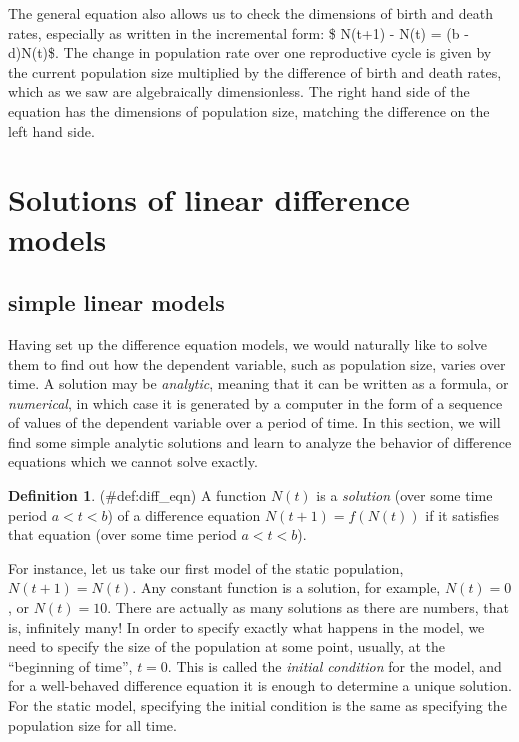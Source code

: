 \documentclass[
]{book}
\theoremstyle{definition}
\newtheorem{definition}{Definition}[chapter]
\theoremstyle{definition}
\theoremstyle{definition}
\theoremstyle{remark}
\begin{document}
The general equation also allows us to check the dimensions of birth and death rates, especially as written in the incremental form: \$ N(t+1) - N(t) = (b - d)N(t)\$. The change in population rate over one reproductive cycle is given by the current population size multiplied by the difference of birth and death rates, which as we saw are algebraically dimensionless. The right hand side of the equation has the dimensions of population size, matching the difference on the left hand side. \citep{edelstein-keshet_mathematical_2005}

\hypertarget{solutions-of-linear-difference-models}{%
\section{Solutions of linear difference models}\label{solutions-of-linear-difference-models}}

\label{sec:math14}

\hypertarget{simple-linear-models}{%
\subsection{simple linear models}\label{simple-linear-models}}

Having set up the difference equation models, we would naturally like to solve them to find out how the dependent variable, such as population size, varies over time. A solution may be  \emph{analytic}, meaning that it can be written as a formula, or  \emph{numerical}, in which case it is generated by a computer in the form of a sequence of values of the dependent variable over a period of time. In this section, we will find some simple analytic solutions and learn to analyze the behavior of difference equations which we cannot solve exactly.

\begin{definition}
\protect\hypertarget{def:diff_eqn}{}{(\#def:diff\_eqn) }A function \(N(t)\) is a \emph{solution} (over some time period \(a < t < b\)) of a difference equation \(N(t+1) = f(N(t))\) if it satisfies that equation (over some time period \(a < t < b\)).
\end{definition}

\label{def:math14_sol}

For instance, let us take our first model of the static population, \(N(t+1) = N(t)\). Any constant function is a solution, for example, \(N(t) = 0\), or \(N(t) = 10\). There are actually as many solutions as there are numbers, that is, infinitely many! In order to specify exactly what happens in the model, we need to specify the size of the population at some point, usually, at the ``beginning of time'', \(t = 0\). This is called the  \emph{initial condition} for the model, and for a well-behaved difference equation it is enough to determine a unique solution. For the static model, specifying the initial condition is the same as specifying the population size for all time.
\end{document}
